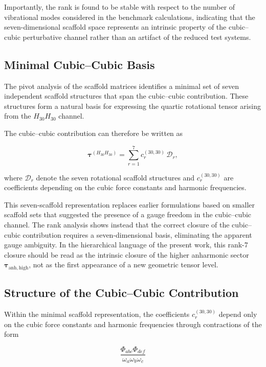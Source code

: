 \documentclass[aip,jcp,reprint]{revtex4-2}
\begin{document}
Importantly, the rank is found to be stable with respect to the number
of vibrational modes considered in the benchmark calculations,
indicating that the seven-dimensional scaffold space represents an
intrinsic property of the cubic--cubic perturbative channel rather
than an artifact of the reduced test systems.

\subsection{Minimal Cubic--Cubic Basis}

The pivot analysis of the scaffold matrices identifies a minimal set
of seven independent scaffold structures that span the cubic--cubic
contribution. These structures form a natural basis for expressing
the quartic rotational tensor arising from the $H_{30}H_{30}$ channel.

The cubic--cubic contribution can therefore be written as

\begin{equation}
\bm{\tau}^{(H_{30}H_{30})}
=
\sum_{r=1}^{7}
c_r^{(30,30)} \,
\bm{\mathcal{D}}_r ,
\end{equation}

where $\bm{\mathcal{D}}_r$ denote the seven rotational scaffold
structures and $c_r^{(30,30)}$ are coefficients depending on
the cubic force constants and harmonic frequencies.

This seven-scaffold representation replaces earlier formulations based
on smaller scaffold sets that suggested the presence of a gauge freedom
in the cubic--cubic channel. The rank analysis shows instead that the
correct closure of the cubic--cubic contribution requires a
seven-dimensional basis, eliminating the apparent gauge ambiguity.
In the hierarchical language of the present work, this rank-7 closure
should be read as the intrinsic closure of the higher anharmonic sector
$\bm{\tau}_{\mathrm{anh,high}}$, not as the first appearance of a new
geometric tensor level.

\subsection{Structure of the Cubic--Cubic Contribution}

Within the minimal scaffold representation, the coefficients
$c_r^{(30,30)}$ depend only on the cubic force constants and harmonic
frequencies through contractions of the form

\begin{equation}
\frac{\Phi_{abc}\Phi_{def}}
{\omega_a \omega_b \omega_c}
\end{equation}
\end{document}
